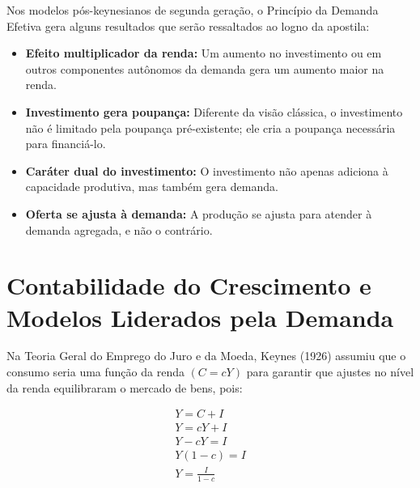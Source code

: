 \documentclass[
  brazilian,
  letterpaper,
  DIV=11,
  numbers=noendperiod]{scrreprt}
\providecommand{\tightlist}{%
  \setlength{\itemsep}{0pt}\setlength{\parskip}{0pt}}
\begin{document}
\begin{tcolorbox}[enhanced jigsaw, arc=.35mm, bottomrule=.15mm, bottomtitle=1mm, breakable, colback=white, colbacktitle=quarto-callout-note-color!10!white, colframe=quarto-callout-note-color-frame, coltitle=black, left=2mm, leftrule=.75mm, opacityback=0, opacitybacktitle=0.6, rightrule=.15mm, title=\textcolor{quarto-callout-note-color}{\faInfo}\hspace{0.5em}{O Princípio da Demanda Efetiva no Longo Prazo}, titlerule=0mm, toprule=.15mm, toptitle=1mm]

Nos modelos pós-keynesianos de segunda geração, o Princípio da Demanda
Efetiva gera alguns resultados que serão ressaltados ao logno da
apostila:

\begin{itemize}
\tightlist
\item
  \textbf{Efeito multiplicador da renda:} Um aumento no investimento ou
  em outros componentes autônomos da demanda gera um aumento maior na
  renda.
\item
  \textbf{Investimento gera poupança:} Diferente da visão clássica, o
  investimento não é limitado pela poupança pré-existente; ele cria a
  poupança necessária para financiá-lo.
\item
  \textbf{Caráter dual do investimento:} O investimento não apenas
  adiciona à capacidade produtiva, mas também gera demanda.
\item
  \textbf{Oferta se ajusta à demanda:} A produção se ajusta para atender
  à demanda agregada, e não o contrário.
\end{itemize}

\end{tcolorbox}

\section{Contabilidade do Crescimento e Modelos Liderados pela
Demanda}\label{sec-contabildiade}

Na Teoria Geral do Emprego do Juro e da Moeda, Keynes (1926) assumiu que
o consumo seria uma função da renda \((C= cY)\) para garantir que
ajustes no nível da renda equilibraram o mercado de bens, pois:

\[
\begin{aligned}
Y= C+I\\
Y = cY+I \\
Y-cY=I \\
Y(1-c)=I\\
Y=\frac{I}{1-c}
\end{aligned}
\]
\end{document}
